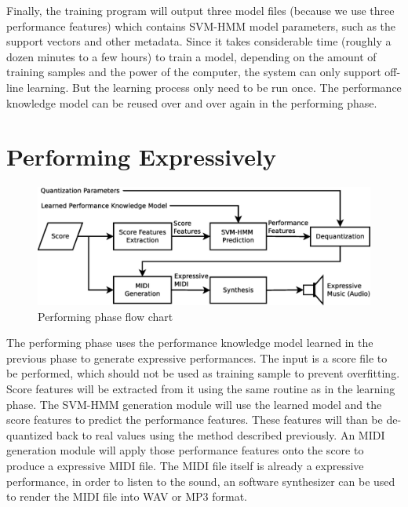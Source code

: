 Finally, the training program will output three model files (because we use three performance features) which contains SVM-HMM model parameters, such as the support vectors and other metadata. Since it takes considerable time (roughly a dozen minutes to a few hours) to train a model, depending on the amount of training samples and the power of the computer, the system can only support off-line learning. But the learning process only need to be run once. The performance knowledge model can be reused over and over again in the performing phase.



\section{Performing Expressively}
   \begin{figure}[tp]
      \begin{center}
         \includegraphics[width=\textwidth]{fig/perf_arch}
      \end{center}
      \caption{Performing phase flow chart} 
      \label{fig:perfflow}
   \end{figure}
The performing phase uses the performance knowledge model learned in the previous phase to generate expressive performances. The input is a score file to be performed, which should not be used as training sample to prevent overfitting. Score features will be extracted from it using the same routine as in the learning phase. The SVM-HMM generation module will use the learned model and the score features to predict the performance features. These features will than be de-quantized back to real values using the method described previously. An MIDI generation module will apply those performance features onto the score to produce a expressive MIDI file. The MIDI file itself is already a expressive performance, in order to listen to the sound, an software synthesizer can be used to render the MIDI file into WAV or MP3 format.
